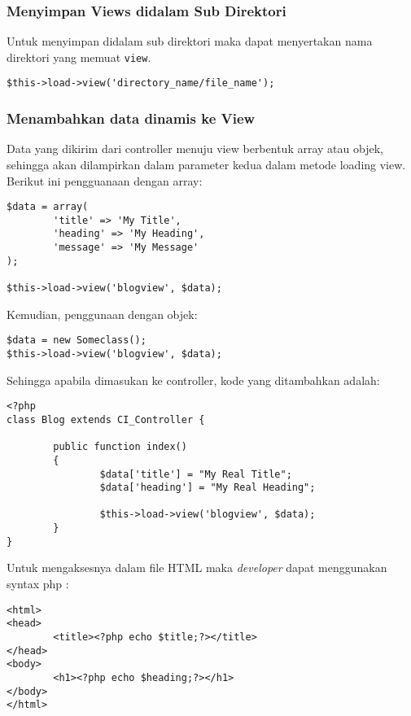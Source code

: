 \subsubsection{Menyimpan Views didalam Sub Direktori}

Untuk menyimpan didalam sub direktori maka dapat menyertakan nama direktori yang memuat \texttt{view}.
\begin{lstlisting}[frame=single] 
$this->load->view('directory_name/file_name');
\end{lstlisting}

\subsubsection{Menambahkan data dinamis ke View}

Data yang dikirim dari controller menuju view berbentuk array atau objek, sehingga akan dilampirkan dalam parameter kedua dalam metode loading view.
Berikut ini pengguanaan dengan array:
\begin{lstlisting}[frame=single] 
$data = array(
        'title' => 'My Title',
        'heading' => 'My Heading',
        'message' => 'My Message'
);

$this->load->view('blogview', $data);
\end{lstlisting}

\noindent Kemudian, penggunaan dengan objek:
\begin{lstlisting}[frame=single] 
$data = new Someclass();
$this->load->view('blogview', $data);
\end{lstlisting}

\noindent Sehingga apabila dimasukan ke controller, kode yang ditambahkan adalah:
\begin{lstlisting}[frame=single] 
<?php
class Blog extends CI_Controller {

        public function index()
        {
                $data['title'] = "My Real Title";
                $data['heading'] = "My Real Heading";

                $this->load->view('blogview', $data);
        }
}
\end{lstlisting}

Untuk mengaksesnya dalam file HTML maka \textit{developer} dapat menggunakan syntax php :
\begin{lstlisting}[frame=single] 
<html>
<head>
        <title><?php echo $title;?></title>
</head>
<body>
        <h1><?php echo $heading;?></h1>
</body>
</html>
\end{lstlisting}

